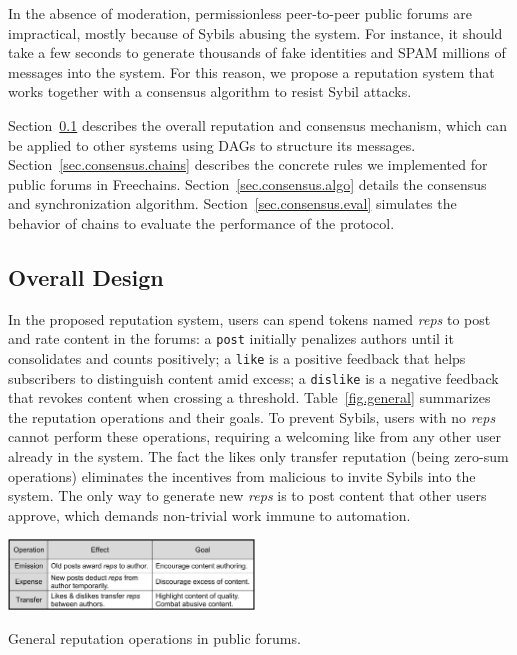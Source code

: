 \documentclass[12pt]{article}
\newcommand{\FC}       {Freechains\xspace}
\newcommand{\reps}     {\emph{reps}\xspace}
\newcommand{\code}[1]  {\texttt{\footnotesize{#1}}}
\begin{document}
In the absence of moderation, permissionless peer-to-peer public forums are
impractical, mostly because of Sybils abusing the system.
For instance, it should take a few seconds to generate thousands of fake
identities and SPAM millions of messages into the system.
For this reason, we propose a reputation system that works together with a
consensus algorithm to resist Sybil attacks.

Section~\ref{sec.consensus.design} describes the overall reputation and
consensus mechanism, which can be applied to other systems using DAGs to
structure its messages.
Section~\ref{sec.consensus.chains} describes the concrete rules we implemented
for public forums in \FC.
Section~\ref{sec.consensus.algo} details the consensus and synchronization
algorithm.
Section~\ref{sec.consensus.eval} simulates the behavior of chains to evaluate
the performance of the protocol.

\subsection{Overall Design}
\label{sec.consensus.design}

In the proposed reputation system, users can spend tokens named \reps to post
and rate content in the forums:
a \code{post} initially penalizes authors until it consolidates and counts
positively;
a \code{like} is a positive feedback that helps subscribers to distinguish
content amid excess;
a \code{dislike} is a negative feedback that revokes content when crossing a
threshold.
Table~\ref{fig.general} summarizes the reputation operations and their goals.
To prevent Sybils, users with no \reps cannot perform these operations,
requiring a welcoming like from any other user already in the system.
The fact the likes only transfer reputation (being zero-sum operations)
eliminates the incentives from malicious to invite Sybils into the system.
The only way to generate new \reps is to post content that other users approve,
which demands non-trivial work immune to automation.

\begin{table}
\centering
\includegraphics[width=0.49\textwidth]{general.png}
\caption{General reputation operations in public forums.}
\label{fig.general}
\end{table}
\end{document}
